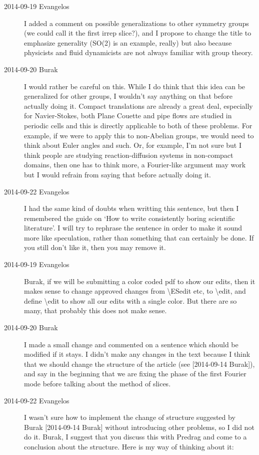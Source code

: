 \begin{description}
\item[2014-09-19 Evangelos] I added a comment on possible generalizations to other symmetry groups (we could call it the first irrep slice?),
and I propose to change the title to emphasize generality (SO(2) is an example, really) but also because physicists and fluid dynamicists are not always familiar
with group theory.

\item[2014-09-20 Burak] I would rather be careful on this. While I do think that
this idea can be generalized for other groups, I wouldn't say anything on that
before actually doing it. Compact translations are already a great deal, especially
for Navier-Stokes, both Plane Couette and pipe flows are studied in periodic cells
and this is directly applicable to both of these problems. For example, if we were
to apply this to non-Abelian groups, we would need to think about Euler angles and
such. Or, for example, I'm not sure but I think people are studying reaction-diffusion
systems in non-compact domains, then one has to think more, a Fourier-like argument
may work but I would refrain from saying that before actually doing it.

\item[2014-09-22 Evangelos] I had the same kind of doubts when writting this sentence,
but then I remembered the guide on `How to write consistently boring scientific literature'.
I will try to rephrase the sentence in order to make it sound
more like speculation, rather than something that can certainly be done. If you still don't
like it, then you may remove it.

\item[2014-09-19 Evangelos] Burak, if we will be submitting a color coded pdf to show our edits, then it makes sense to change approved changes from \textbackslash ESedit etc, to \textbackslash edit,
and define \textbackslash edit to show all our edits with a single color. But there are so many, that probably this does not make sense.

\item[2014-09-20 Burak] I made a small change and commented on a sentence
which should be modified if it stays. I didn't make any changes in the text
because I think that we should change the structure of the article (see
[2014-09-14 Burak]), and say in the beginning that we are fixing the phase
of the first Fourier mode before talking about the method of slices.

\item[2014-09-22 Evangelos] I wasn't sure how to implement the change of structure suggested
by Burak [2014-09-14 Burak] without introducing other problems, so I did not do it. Burak, I suggest that you discuss
this with Predrag and come to a conclusion about the structure. Here is my way of thinking about it:


\end{description}
